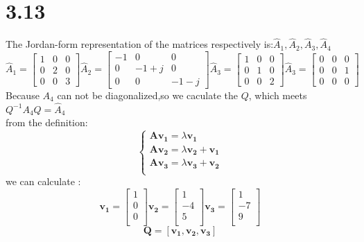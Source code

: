 \documentclass{article}
\begin{document}
\section*{3.13}
The Jordan-form representation of the matrices respectively is:$\hat{A}_{1},\hat{A}_{2},\hat{A}_{3},\hat{A}_{4}$
\begin{equation*}
\hat{A}_{1}=\left[\begin{array}{lll}
1 & 0 & 0 \\
0 & 2 & 0 \\
0 & 0 & 3
\end{array}\right]
\hat{A}_{2}=\left[\begin{array}{ccc}
    -1 & 0 & 0 \\
    0 & -1+j & 0 \\
    0 & 0 & -1-j
    \end{array}\right]
\hat{A}_{3}=\left[\begin{array}{lll}
    1 & 0 & 0 \\
    0 & 1 & 0 \\
    0 & 0 & 2
    \end{array}\right]
\hat{A}_{3}=\left[\begin{array}{lll}
    0 & 0 & 0 \\
    0 & 0 & 1 \\
    0 & 0 & 0
    \end{array}\right]
\end{equation*}
Because $A_4$ can not be diagonalized,so we caculate the $Q$,
which meets $Q^{-1}A_4Q=\hat{A}_{4}$\\
from the definition:
$$
\left\{\begin{array}{ll}
\boldsymbol{Av_1}=\lambda\boldsymbol{v_1}\\
\boldsymbol{Av_2}=\lambda\boldsymbol{v_2}+\boldsymbol{v_1}\\
\boldsymbol{Av_3}=\lambda\boldsymbol{v_3}+\boldsymbol{v_2}\\
\end{array}\right.
$$
we can calculate :
\begin{equation*}
\boldsymbol{v_1}=
\left[
\begin{array}{c}
1\\
0\\
0\\
\end{array}
\right]
\boldsymbol{v_2}=
\left[
\begin{array}{c}
1\\
-4\\
5\\
\end{array}
\right]
\boldsymbol{v_3}=
\left[
\begin{array}{c}
1\\
-7\\
9\\
\end{array}
\right]
\end{equation*}
\[\boldsymbol{Q}=[\boldsymbol{v_1,v_2,v_3}]\]
\end{document}

